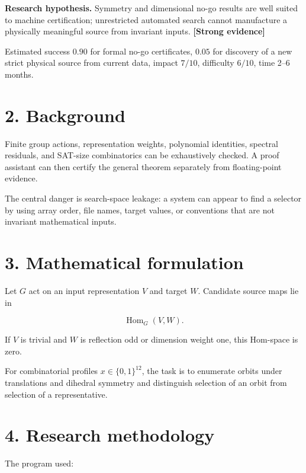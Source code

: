 \documentclass[11pt,a4paper,openany]{report}
\newcommand{\statusStrong}{\textcolor{finblue}{[Strong evidence]}}
\begin{document}
\textbf{Research hypothesis.} Symmetry and dimensional no-go results are well suited to machine certification; unrestricted automated search cannot manufacture a physically meaningful source from invariant inputs. \textbf{\statusStrong{}}

Estimated success \(0.90\) for formal no-go certificates, \(0.05\) for discovery of a new strict physical source from current data, impact \(7/10\), difficulty \(6/10\), time 2–6 months.

\section{2. Background}

Finite group actions, representation weights, polynomial identities, spectral residuals, and SAT-size combinatorics can be exhaustively checked. A proof assistant can then certify the general theorem separately from floating-point evidence.

The central danger is search-space leakage: a system can appear to find a selector by using array order, file names, target values, or conventions that are not invariant mathematical inputs.

\section{3. Mathematical formulation}

Let \(G\) act on an input representation \(V\) and target \(W\). Candidate source maps lie in

\[
\operatorname{Hom}_G(V,W).
\]

If \(V\) is trivial and \(W\) is reflection odd or dimension weight one, this Hom-space is zero.

For combinatorial profiles \(x\in\{0,1\}^{12}\), the task is to enumerate orbits under translations and dihedral symmetry and distinguish selection of an orbit from selection of a representative.

\section{4. Research methodology}

The program used:
\end{document}
